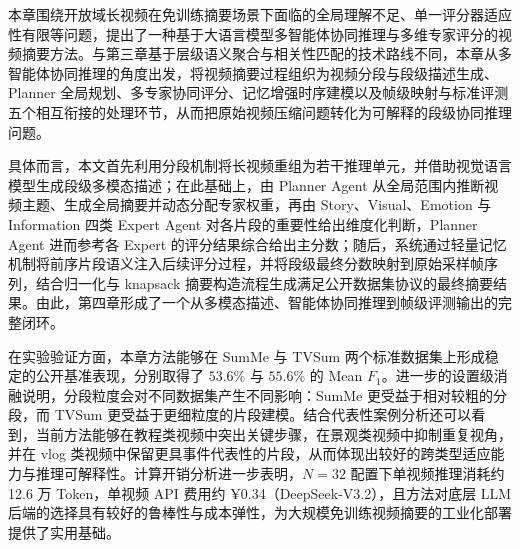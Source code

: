 
本章围绕开放域长视频在免训练摘要场景下面临的全局理解不足、单一评分器适应性有限等问题，提出了一种基于大语言模型多智能体协同推理与多维专家评分的视频摘要方法。与第三章基于层级语义聚合与相关性匹配的技术路线不同，本章从多智能体协同推理的角度出发，将视频摘要过程组织为视频分段与段级描述生成、Planner 全局规划、多专家协同评分、记忆增强时序建模以及帧级映射与标准评测五个相互衔接的处理环节，从而把原始视频压缩问题转化为可解释的段级协同推理问题。

具体而言，本文首先利用分段机制将长视频重组为若干推理单元，并借助视觉语言模型生成段级多模态描述；在此基础上，由 Planner Agent 从全局范围内推断视频主题、生成全局摘要并动态分配专家权重，再由 Story、Visual、Emotion 与 Information 四类 Expert Agent 对各片段的重要性给出维度化判断，Planner Agent 进而参考各 Expert 的评分结果综合给出主分数；随后，系统通过轻量记忆机制将前序片段语义注入后续评分过程，并将段级最终分数映射到原始采样帧序列，结合归一化与 knapsack 摘要构造流程生成满足公开数据集协议的最终摘要结果。由此，第四章形成了一个从多模态描述、智能体协同推理到帧级评测输出的完整闭环。

在实验验证方面，本章方法能够在 SumMe 与 TVSum 两个标准数据集上形成稳定的公开基准表现，分别取得了 $53.6\%$ 与 $55.6\%$ 的 Mean $F_1$。进一步的设置级消融说明，分段粒度会对不同数据集产生不同影响：SumMe 更受益于相对较粗的分段，而 TVSum 更受益于更细粒度的片段建模。结合代表性案例分析还可以看到，当前方法能够在教程类视频中突出关键步骤，在景观类视频中抑制重复视角，并在 vlog 类视频中保留更具事件代表性的片段，从而体现出较好的跨类型适应能力与推理可解释性。计算开销分析进一步表明，$N=32$ 配置下单视频推理消耗约 12.6 万 Token，单视频 API 费用约 ¥0.34（DeepSeek-V3.2），且方法对底层 LLM 后端的选择具有较好的鲁棒性与成本弹性，为大规模免训练视频摘要的工业化部署提供了实用基础。
